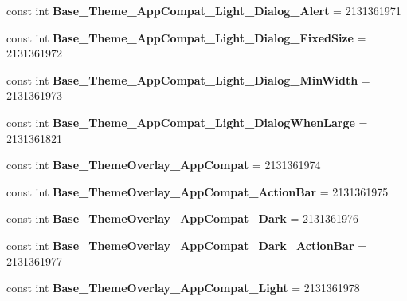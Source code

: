 \begin{DoxyCompactItemize}
const int {\bfseries Base\+\_\+\+Theme\+\_\+\+App\+Compat\+\_\+\+Light\+\_\+\+Dialog\+\_\+\+Alert} = 2131361971
\item 
\mbox{\label{classXaria_1_1Resource_1_1Style_af10515f8768b54a6aa01684e374c1e61}} 
const int {\bfseries Base\+\_\+\+Theme\+\_\+\+App\+Compat\+\_\+\+Light\+\_\+\+Dialog\+\_\+\+Fixed\+Size} = 2131361972
\item 
\mbox{\label{classXaria_1_1Resource_1_1Style_ae412d5658a42c33958503a18c35c5f34}} 
const int {\bfseries Base\+\_\+\+Theme\+\_\+\+App\+Compat\+\_\+\+Light\+\_\+\+Dialog\+\_\+\+Min\+Width} = 2131361973
\item 
\mbox{\label{classXaria_1_1Resource_1_1Style_a686ab9c3481a00b2d97526baed342ff9}} 
const int {\bfseries Base\+\_\+\+Theme\+\_\+\+App\+Compat\+\_\+\+Light\+\_\+\+Dialog\+When\+Large} = 2131361821
\item 
\mbox{\label{classXaria_1_1Resource_1_1Style_a87062811a05f78c89d49de2cdf47f854}} 
const int {\bfseries Base\+\_\+\+Theme\+Overlay\+\_\+\+App\+Compat} = 2131361974
\item 
\mbox{\label{classXaria_1_1Resource_1_1Style_a98e7986fe98ee6c35fbad7e2e13ebaf6}} 
const int {\bfseries Base\+\_\+\+Theme\+Overlay\+\_\+\+App\+Compat\+\_\+\+Action\+Bar} = 2131361975
\item 
\mbox{\label{classXaria_1_1Resource_1_1Style_aa0a6ac21848b5d0f89957a512a6757c9}} 
const int {\bfseries Base\+\_\+\+Theme\+Overlay\+\_\+\+App\+Compat\+\_\+\+Dark} = 2131361976
\item 
\mbox{\label{classXaria_1_1Resource_1_1Style_a64ac3ebae0f2f00c894cf7f9d25f69f1}} 
const int {\bfseries Base\+\_\+\+Theme\+Overlay\+\_\+\+App\+Compat\+\_\+\+Dark\+\_\+\+Action\+Bar} = 2131361977
\item 
\mbox{\label{classXaria_1_1Resource_1_1Style_a9e89e028734e45610949b3592f1aa344}} 
const int {\bfseries Base\+\_\+\+Theme\+Overlay\+\_\+\+App\+Compat\+\_\+\+Light} = 2131361978

\end{DoxyCompactItemize}
